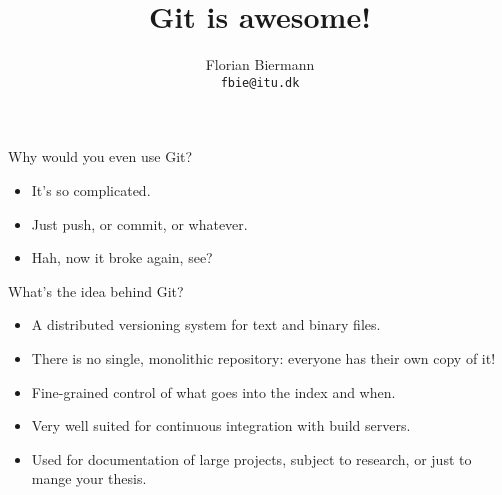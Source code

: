 \documentclass{beamer}
\title{Git is awesome!}
\author{Florian Biermann\\\texttt{fbie@itu.dk}}
\institute{Pit Lab\\IT University of Copenhagen}
\begin{document}
\frame{\titlepage}

\begin{frame}{Why would you even use Git?}

\begin{itemize}
\item It's so complicated.
\item Just push, or commit, or whatever.
\item Hah, now it broke again, see?
\end{itemize}

\end{frame}

\begin{frame}{What's the idea behind Git?}

\begin{itemize}
\item A distributed versioning system for text and binary files.
\item There is no single, monolithic repository: everyone has their own copy of it!
\item Fine-grained control of what goes into the index and when.
\item Very well suited for continuous integration with build servers.
\item Used for documentation of large projects, subject to research, or just to mange your thesis.
\end{itemize}

\end{frame}
\end{document}
